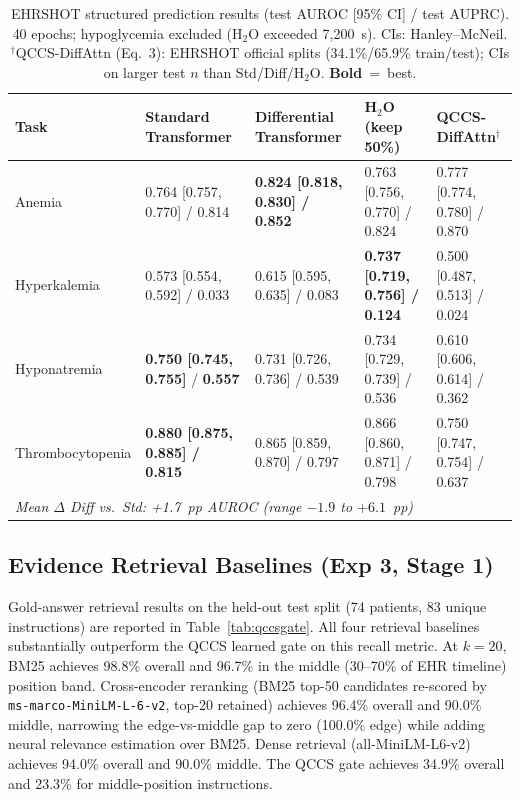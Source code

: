 \documentclass{article}
\begin{document}
\begin{table}[t]
\centering
\caption{EHRSHOT structured prediction results (test AUROC [95\% CI] / test AUPRC).
  40 epochs; hypoglycemia excluded (H$_2$O exceeded 7,200~s). CIs: Hanley--McNeil.
  $^\dagger$QCCS-DiffAttn (Eq.~3): EHRSHOT official splits (34.1\%/65.9\%
  train/test); CIs on larger test $n$ than Std/Diff/H$_2$O. \textbf{Bold}~=~best.}
\label{tab:ehrshot}
\scriptsize\setlength{\tabcolsep}{2pt}
\begin{tabular}{@{}p{1.8cm}p{2.5cm}p{2.5cm}p{2.3cm}p{2.5cm}@{}}
\toprule
Task & Standard Transformer & Differential Transformer & H$_2$O (keep 50\%) & QCCS-DiffAttn$^\dagger$ \\
\midrule
Anemia         & 0.764 [0.757, 0.770] / 0.814 & \textbf{0.824 [0.818, 0.830] / 0.852} & 0.763 [0.756, 0.770] / 0.824 & 0.777 [0.774, 0.780] / 0.870 \\
Hyperkalemia   & 0.573 [0.554, 0.592] / 0.033 & 0.615 [0.595, 0.635] / 0.083 & \textbf{0.737 [0.719, 0.756] / 0.124} & 0.500 [0.487, 0.513] / 0.024 \\
Hyponatremia   & \textbf{0.750 [0.745, 0.755]} / \textbf{0.557} & 0.731 [0.726, 0.736] / 0.539 & 0.734 [0.729, 0.739] / 0.536 & 0.610 [0.606, 0.614] / 0.362 \\
Thrombocytopenia & \textbf{0.880 [0.875, 0.885] / 0.815} & 0.865 [0.859, 0.870] / 0.797 & 0.866 [0.860, 0.871] / 0.798 & 0.750 [0.747, 0.754] / 0.637 \\
\midrule
\multicolumn{5}{l}{\small\textit{Mean $\Delta$ Diff vs.\ Std: +1.7~pp AUROC (range $-1.9$ to $+6.1$~pp)}} \\
\bottomrule
\end{tabular}
\end{table}

\subsection{Evidence Retrieval Baselines (Exp 3, Stage 1)}

Gold-answer retrieval results on the held-out test split (74 patients, 83 unique
instructions) are reported in Table~\ref{tab:qccsgate}. All four retrieval
baselines substantially outperform the QCCS learned gate on this recall metric.
At $k{=}20$, BM25 achieves 98.8\% overall and 96.7\% in the middle
(30--70\% of EHR timeline) position band. Cross-encoder reranking (BM25 top-50
candidates re-scored by \texttt{ms-marco-MiniLM-L-6-v2}, top-20 retained)
achieves 96.4\% overall and 90.0\% middle, narrowing the edge-vs-middle gap
to zero (100.0\% edge) while adding neural relevance estimation over BM25.
Dense retrieval (all-MiniLM-L6-v2) achieves 94.0\% overall and 90.0\% middle.
The QCCS gate achieves 34.9\% overall and 23.3\% for middle-position instructions.
\end{document}
